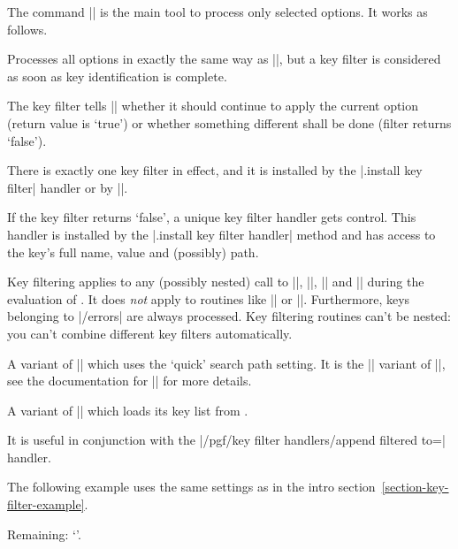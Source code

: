 The command |\pgfkeysfiltered| is the main tool to process only selected
options. It works as follows.
%
\begin{command}{\pgfkeysfiltered{}}
    Processes all options in exactly the same way as
    |\pgfkeys|, but a key filter is considered as soon as
    key identification is complete.

    The key filter tells |\pgfkeysfiltered| whether it should continue to apply
    the current option (return value is `true') or whether something different
    shall be done (filter returns `false').

    There is exactly one key filter in effect, and it is installed by the
    |.install key filter| handler or by |\pgfkeysinstallkeyfilter|.

    If the key filter returns `false', a unique key filter handler gets
    control. This handler is installed by the |.install key filter handler|
    method and has access to the key's full name, value and (possibly) path.

    Key filtering applies to any (possibly nested) call to |\pgfkeys|,
    |\pgfkeysalso|, |\pgfqkeys| and |\pgfqkeysalso| during the evaluation of
    . It does \emph{not} apply to routines like
    |\pgfkeyssetvalue| or |\pgfkeysgetvalue|. Furthermore, keys belonging to
    |/errors| are always processed. Key filtering routines can't be nested: you
    can't combine different key filters automatically.
\end{command}

\begin{command}{\pgfqkeysfiltered{}}
    A variant of |\pgfkeysfiltered| which uses the `quick' search path setting.
    It is the |\pgfqkeys| variant of |\pgfkeysfiltered|, see the documentation
    for |\pgfqkeys| for more details.
\end{command}

\begin{command}{\pgfkeysalsofrom{}}
    A variant of |\pgfkeysalso| which loads its key list from .

    It is useful in conjunction with the
    |/pgf/key filter handlers/append filtered to=| handler.

    The following example uses the same settings as in the intro
    section~\ref{section-key-filter-example}.
\begin{codeexample}[]
\def\remainingoptions{}

Remaining: `\remainingoptions'.
\pgfkeysalsofrom{\remainingoptions}
\end{codeexample}
\end{command}

